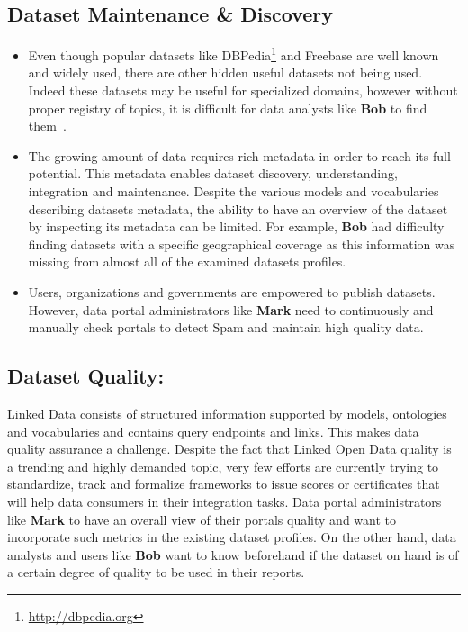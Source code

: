\subsection{Dataset Maintenance \& Discovery}
\begin{itemize}
	\item Even though popular datasets like DBPedia\footnote{\url{http://dbpedia.org}} and Freebase are well known and widely used, there are other hidden useful datasets not being used. Indeed these datasets may be useful for specialized domains, however without proper registry of topics, it is difficult for data analysts like \textbf{Bob} to find them~\cite{Lalithsena:WI:13}.
	\item The growing amount of data requires rich metadata in order to reach its full potential. This metadata enables dataset discovery, understanding, integration and maintenance. Despite the various models and vocabularies describing datasets metadata, the ability to have an overview of the dataset by inspecting its metadata can be limited. For example, \textbf{Bob} had difficulty finding datasets with a specific geographical coverage as this information was missing from almost all of the examined datasets profiles.
	\item Users, organizations and governments are empowered to publish datasets. However, data portal administrators like \textbf{Mark} need to continuously and manually check portals to detect Spam and maintain high quality data.
\end{itemize}

\subsection{Dataset Quality:} Linked Data consists of structured information supported by models, ontologies and vocabularies and contains query endpoints and links. This makes data quality assurance a challenge. Despite the fact that Linked Open Data quality is a trending and highly demanded topic, very few efforts are currently trying to standardize, track and formalize frameworks to issue scores or certificates that will help data consumers in their integration tasks. Data portal administrators like \textbf{Mark} to have an overall view of their portals quality and want to incorporate such metrics in the existing dataset profiles. On the other hand, data analysts and users like \textbf{Bob} want to know beforehand if the dataset on hand is of a certain degree of quality to be used in their reports.


